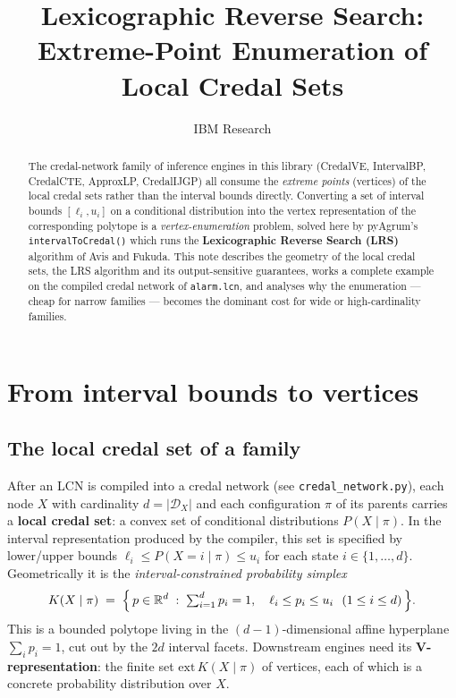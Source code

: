 \documentclass[11pt]{article}
\title{Lexicographic Reverse Search:\\Extreme-Point Enumeration of Local Credal Sets}
\author{IBM Research}
\date{}
\begin{document}
\maketitle

\begin{abstract}
The credal-network family of inference engines in this library (CredalVE, IntervalBP,
CredalCTE, ApproxLP, CredalIJGP) all consume the \emph{extreme points} (vertices) of the
local credal sets rather than the interval bounds directly. Converting a set of interval
bounds $[\ell_i, u_i]$ on a conditional distribution into the vertex representation of the
corresponding polytope is a \emph{vertex-enumeration} problem, solved here by pyAgrum's
\texttt{intervalToCredal()} which runs the \textbf{Lexicographic Reverse Search (LRS)}
algorithm of Avis and Fukuda. This note describes the geometry of the local credal sets,
the LRS algorithm and its output-sensitive guarantees, works a complete example on the
compiled credal network of \texttt{alarm.lcn}, and analyses why the enumeration --- cheap
for narrow families --- becomes the dominant cost for wide or high-cardinality families.
\end{abstract}

\section{From interval bounds to vertices}

\subsection{The local credal set of a family}

After an LCN is compiled into a credal network (see \texttt{credal\_network.py}), each node
$X$ with cardinality $d = |\mathcal{D}_X|$ and each configuration $\pi$ of its parents
carries a \textbf{local credal set}: a convex set of conditional distributions
$P(X \mid \pi)$. In the interval representation produced by the compiler, this set is
specified by lower/upper bounds $\ell_i \le P(X{=}i \mid \pi) \le u_i$ for each state
$i \in \{1, \dots, d\}$. Geometrically it is the \emph{interval-constrained probability
simplex}
\begin{equation}
  K(X \mid \pi) \;=\; \Bigl\{\, p \in \mathbb{R}^d \;:\;
    \textstyle\sum_{i=1}^d p_i = 1,\quad
    \ell_i \le p_i \le u_i \ \ (1 \le i \le d) \,\Bigr\}.
  \label{eq:local}
\end{equation}
This is a bounded polytope living in the $(d{-}1)$-dimensional affine hyperplane
$\sum_i p_i = 1$, cut out by the $2d$ interval facets. Downstream engines need its
\textbf{V-representation}: the finite set $\mathrm{ext}\,K(X\mid\pi)$ of vertices, each of
which is a concrete probability distribution over $X$.
\end{document}
